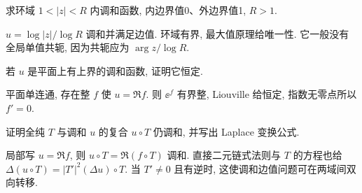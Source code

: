 \begin{exercise}
求环域 $1<|z|<R$ 内调和函数, 内边界值0、外边界值1, $R>1$.
\end{exercise}
\begin{solution}
$u=\log|z|/\log R$ 调和并满足边值. 环域有界, 最大值原理给唯一性. 它一般没有全局单值共轭, 因为共轭应为 $\arg z/\log R$.
\end{solution}
\begin{exercise}
若 $u$ 是平面上有上界的调和函数, 证明它恒定.
\end{exercise}
\begin{solution}
平面单连通, 存在整 $f$ 使 $u=\Re f$. 则 $\ee^f$ 有界整, Liouville 给恒定, 指数无零点所以 $f'=0$.
\end{solution}
\begin{exercise}
证明全纯 $T$ 与调和 $u$ 的复合 $u\circ T$ 仍调和, 并写出 Laplace 变换公式.
\end{exercise}
\begin{solution}
局部写 $u=\Re f$, 则 $u\circ T=\Re(f\circ T)$ 调和. 直接二元链式法则与 $T$ 的方程也给 $\Delta(u\circ T)=|T'|^2(\Delta u)\circ T$. 当 $T'\ne0$ 且有逆时, 这使调和边值问题可在两域间双向转移.
\end{solution}
